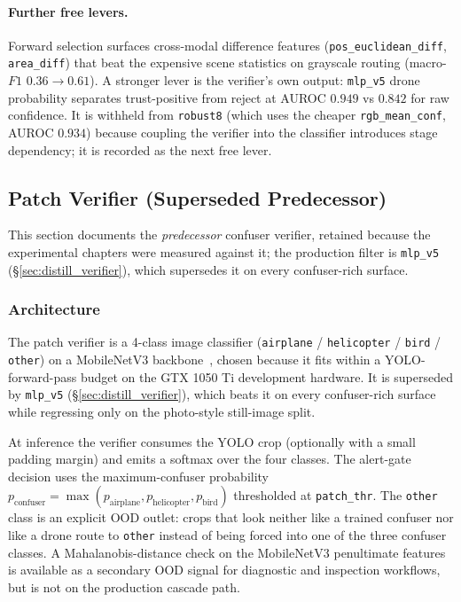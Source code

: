 \paragraph{Further free levers.}
Forward selection surfaces cross-modal difference features (\texttt{pos\_euclidean\_diff}, \texttt{area\_diff}) that beat the expensive scene statistics on grayscale routing (macro-$F1$ $0.36 \to 0.61$). A stronger lever is the verifier's own output: \texttt{mlp\_v5} drone probability separates trust-positive from reject at AUROC $0.949$ vs $0.842$ for raw confidence. It is withheld from \texttt{robust8} (which uses the cheaper \texttt{rgb\_mean\_conf}, AUROC $0.934$) because coupling the verifier into the classifier introduces stage dependency; it is recorded as the next free lever.

\subsection{Patch Verifier (Superseded Predecessor)}
\label{sec:patch_verifier_arch}

This section documents the \emph{predecessor} confuser verifier, retained because the experimental chapters were measured against it; the production filter is \texttt{mlp\_v5} (\S\ref{sec:distill_verifier}), which supersedes it on every confuser-rich surface.

\subsubsection{Architecture}

The patch verifier is a 4-class image classifier (\texttt{airplane} / \texttt{helicopter} / \texttt{bird} / \texttt{other}) on a MobileNetV3 backbone~\cite{howard2019mobilenetv3}, chosen because it fits within a YOLO-forward-pass budget on the GTX 1050 Ti development hardware. It is superseded by \texttt{mlp\_v5} (\S\ref{sec:distill_verifier}), which beats it on every confuser-rich surface while regressing only on the photo-style still-image split.

At inference the verifier consumes the YOLO crop (optionally with a small padding margin) and emits a softmax over the four classes. The alert-gate decision uses the maximum-confuser probability $p_\text{confuser} = \max(p_\text{airplane}, p_\text{helicopter}, p_\text{bird})$ thresholded at \texttt{patch\_thr}. The \texttt{other} class is an explicit OOD outlet: crops that look neither like a trained confuser nor like a drone route to \texttt{other} instead of being forced into one of the three confuser classes. A Mahalanobis-distance check on the MobileNetV3 penultimate features is available as a secondary OOD signal for diagnostic and inspection workflows, but is not on the production cascade path.

